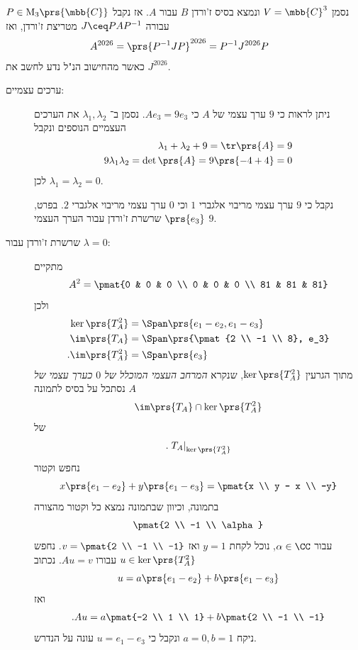 \documentclass[a4paper,10pt,twoside,openany]{book}
\renewcommand{\Mat}{\mathrm{M}}
\begin{document}
\begin{solution}
נסמן
$V = \mbb{C}^3$
ונמצא בסיס ז'ורדן
$B$
עבור
$A$.
אז נקבל
$P \in \Mat_3\prs{\mbb{C}}$
עבורה
$J \ceq P A P^{-1}$
מטריצת ז'ורדן, ואז
\begin{align*}
A^{2026} &= \prs{P^{-1}JP}^{2026}
= P^{-1}J^{2026}P
\end{align*}
כאשר מהחישוב הנ"ל נדע לחשב את
$J^{2026}$.

\begin{description}
\item[ערכים עצמיים:]
ניתן לראות כי
$9$
ערך עצמי של
$A$
כי
$A e_3 = 9 e_3$.
נסמן ב־%
$\lambda_1, \lambda_2$
את הערכים העצמיים הנוספים ונקבל
\begin{align*}
\lambda_1 + \lambda_2 + 9 = \tr\prs{A} = 9 \\
9 \lambda_1 \lambda_2 = \det\prs{A} = 9\prs{-4+4} = 0
\end{align*}
לכן
$\lambda_1 = \lambda_2 = 0$.

נקבל כי
$9$
ערך עצמי מריבוי אלגברי
$1$
וכי
$0$
ערך עצמי מריבוי אלגברי
$2$.
בפרט,
$\prs{e_3}$
שרשרת ז'ורדן עבור הערך העצמי
$9$.
\item[שרשרת ז'ורדן עבור
$\lambda = 0$:]
מתקיים
\begin{align*}
A^2 = \pmat{0 & 0 & 0 \\ 0 & 0 & 0 \\ 81 & 81 & 81}
\end{align*}
ולכן
\begin{align*}
\ker\prs{T_A^2} &= \Span\prs{e_1 - e_2, e_1 - e_3} \\
\im\prs{T_A} &= \Span\prs{\pmat{2 \\ -1 \\ 8}, e_3} \\\text{.} \im\prs{T_A^2} &= \Span\prs{e_3}
\end{align*}
מתוך הגרעין
$\ker\prs{T_A^2}$,
שנקרא
\emph{המרחב העצמי המוכלל של
$0$
כערך עצמי של
$A$}
נסתכל על בסיס לתמונה
\[\im\prs{T_A} \cap \ker\prs{T_A^2}\]
של
\begin{align*}
\text{.} \left. T_A \right|_{\ker\prs{T_A^2}}
\end{align*}
נחפש וקטור
\[x \prs{e_1 - e_2} + y \prs{e_1 - e_3} = \pmat{x \\ y - x \\ -y}\]
בתמונה, וכיוון שבתמונה נמצא כל וקטור מהצורה
\begin{align*}
\pmat{2 \\ -1 \\ \alpha}
\end{align*}
עבור
$\alpha \in \CC$,
נוכל לקחת
$y = 1$
ואז
$v = \pmat{2 \\ -1 \\ -1}$.
נחפש
$u \in \ker\prs{T_A^2}$
עבורו
$A u = v$.
נכתוב
\[u = a \prs{e_1 - e_2} + b \prs{e_1 - e_3}\]
ואז
\begin{align*}
\text{.} Au = a \pmat{-2 \\ 1 \\ 1} + b \pmat{2 \\ -1 \\ -1}
\end{align*}
ניקח
$a = 0, b = 1$
ונקבל כי
$u = e_1 - e_3$
עונה על הנדרש.


\end{description}
\end{solution}
\end{document}
